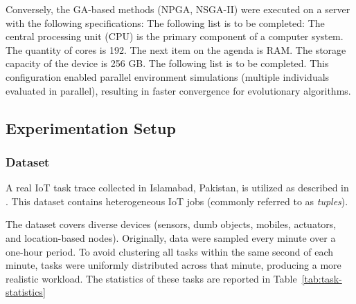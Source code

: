 \documentclass[preprint,12pt]{elsarticle}
\begin{document}
Conversely, the GA-based methods (NPGA, NSGA-II) were executed on a server with the following specifications:
The following list is to be completed:
    The central processing unit (CPU) is the primary component of a computer system. The quantity of cores is 192.
    The next item on the agenda is RAM. The storage capacity of the device is 256 GB.
The following list is to be completed.
This configuration enabled parallel environment simulations (multiple individuals evaluated in parallel), resulting in faster convergence for evolutionary algorithms.




\subsection{Experimentation Setup}

\subsubsection{Dataset}
\label{subsec:dataset}



A real IoT task trace collected in Islamabad, Pakistan, is utilized as described in \cite{aazam_cloud_2022}. This dataset contains heterogeneous IoT jobs (commonly referred to as \emph{tuples}).

The dataset covers diverse devices (sensors, dumb objects, mobiles, actuators, and location-based nodes). Originally, data were sampled every minute over a one-hour period. To avoid clustering all tasks within the same second of each minute, tasks were uniformly distributed across that minute, producing a more realistic workload. The statistics of these tasks are reported in Table~\ref{tab:task-statistics}

\begin{table}[h!]
\centering
\caption{Statistical Summary of Generated Tasks}
\label{tab:task-statistics}
\end{table}
\end{document}

